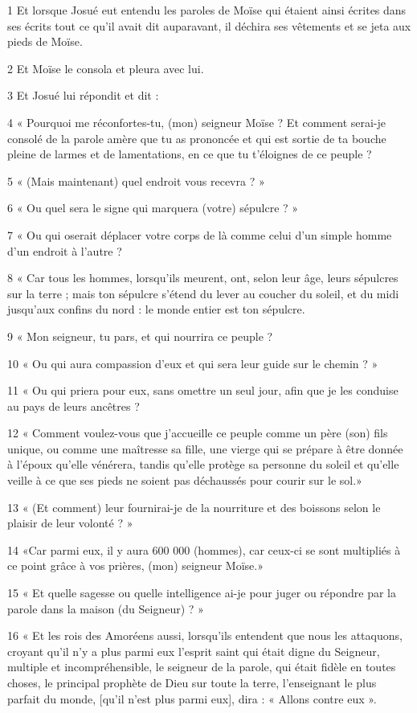 \par 1 Et lorsque Josué eut entendu les paroles de Moïse qui étaient ainsi écrites dans ses écrits tout ce qu'il avait dit auparavant, il déchira ses vêtements et se jeta aux pieds de Moïse.
\par 2 Et Moïse le consola et pleura avec lui.
\par 3 Et Josué lui répondit et dit :
\par 4 « Pourquoi me réconfortes-tu, (mon) seigneur Moïse ? Et comment serai-je consolé de la parole amère que tu as prononcée et qui est sortie de ta bouche pleine de larmes et de lamentations, en ce que tu t'éloignes de ce peuple ?
\par 5 « (Mais maintenant) quel endroit vous recevra ? »
\par 6 « Ou quel sera le signe qui marquera (votre) sépulcre ? »
\par 7 « Ou qui oserait déplacer votre corps de là comme celui d'un simple homme d'un endroit à l'autre ?
\par 8 « Car tous les hommes, lorsqu'ils meurent, ont, selon leur âge, leurs sépulcres sur la terre ; mais ton sépulcre s'étend du lever au coucher du soleil, et du midi jusqu'aux confins du nord : le monde entier est ton sépulcre.
\par 9 « Mon seigneur, tu pars, et qui nourrira ce peuple ?
\par 10 « Ou qui aura compassion d'eux et qui sera leur guide sur le chemin ? »
\par 11 « Ou qui priera pour eux, sans omettre un seul jour, afin que je les conduise au pays de leurs ancêtres ?
\par 12 « Comment voulez-vous que j'accueille ce peuple comme un père (son) fils unique, ou comme une maîtresse sa fille, une vierge qui se prépare à être donnée à l'époux qu'elle vénérera, tandis qu'elle protège sa personne du soleil et qu'elle veille à ce que ses pieds ne soient pas déchaussés pour courir sur le sol.»
\par 13 « (Et comment) leur fournirai-je de la nourriture et des boissons selon le plaisir de leur volonté ? »
\par 14 «Car parmi eux, il y aura 600 000 (hommes), car ceux-ci se sont multipliés à ce point grâce à vos prières, (mon) seigneur Moïse.»
\par 15 « Et quelle sagesse ou quelle intelligence ai-je pour juger ou répondre par la parole dans la maison (du Seigneur) ? »
\par 16 « Et les rois des Amoréens aussi, lorsqu'ils entendent que nous les attaquons, croyant qu'il n'y a plus parmi eux l'esprit saint qui était digne du Seigneur, multiple et incompréhensible, le seigneur de la parole, qui était fidèle en toutes choses, le principal prophète de Dieu sur toute la terre, l'enseignant le plus parfait du monde, [qu'il n'est plus parmi eux], dira : « Allons contre eux ».
